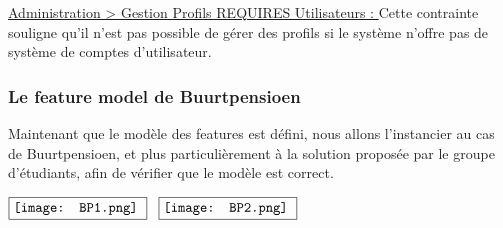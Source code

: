 \underline{Administration > Gestion Profils REQUIRES Utilisateurs : } Cette contrainte souligne qu'il n'est pas possible de gérer des profils si le système n'offre pas de système de comptes d'utilisateur.

\subsubsection{Le feature model de Buurtpensioen}

Maintenant que le modèle des features est défini,  nous allons l'instancier au cas de Buurtpensioen,  et plus particulièrement à la solution proposée par le groupe d'étudiants,  afin de vérifier que le modèle est correct.

$\vcenter{\hbox{\fbox{\texttt{[image: BP1.png]} } }}$ \hspace{3 cm}
$\vcenter{\hbox{\fbox{\texttt{[image: BP2.png]} } }}$
